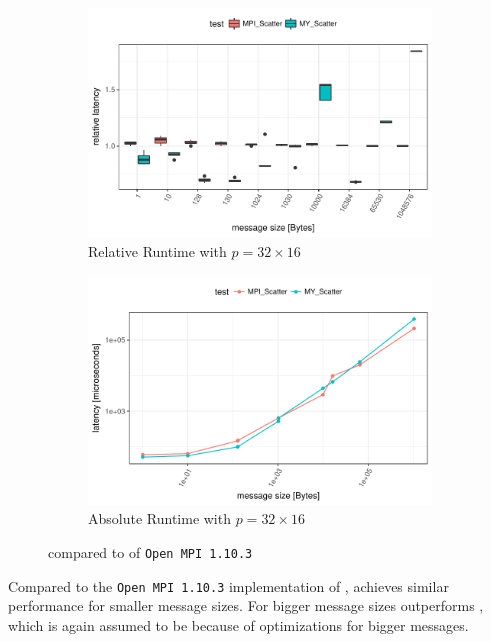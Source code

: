 \begin{figure}[H]
    \begin{subfigure}[b]{0.49\textwidth}
        \includegraphics[width=\textwidth]{../benchmarks/openmpi/divide_conquer/scatter_32/rel_runtime.pdf}
        \caption{Relative Runtime with $p=32 \times 16$}
        \label{fig:Scatter:OpenMPI:Rel:32}
    \end{subfigure}
    \begin{subfigure}[b]{0.49\textwidth}
        \includegraphics[width=\textwidth]{../benchmarks/openmpi/divide_conquer/scatter_32/runtime.pdf}
        \caption{Absolute Runtime with $p=32 \times 16$}
        \label{fig:Scatter:OpenMPI:Abs:32}
    \end{subfigure}
    
    \caption{\myscatter compared to \mpiscatter of \texttt{Open MPI 1.10.3}}
\end{figure}

Compared to the \texttt{Open MPI 1.10.3} implementation of \mpiscatter, \myscatter achieves similar performance for smaller message sizes. 
For bigger message sizes \mpiscatter outperforms \myscatter, which is again assumed to be because of optimizations for bigger messages.


